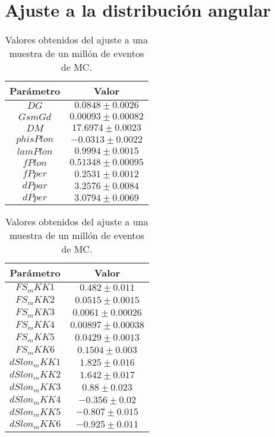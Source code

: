\section{Ajuste a la distribución angular}

\begin{table}[H]
\centering
\begin{multicols}{2}
\begin{tabular}{cc}
\toprule
Parámetro & Valor \\ \midrule
$ DG          $&$ 0.0848 \pm 0.0026 $ \\
$ GsmGd       $&$0.00093 \pm 0.00082$ \\
$ DM          $&$ 17.6974 \pm 0.0023$ \\
$ phisPlon    $&$ -0.0313 \pm 0.0022$ \\
$ lamPlon     $&$ 0.9994 \pm 0.0015 $ \\
$ fPlon       $&$0.51348 \pm 0.00095$ \\
$ fPper       $&$ 0.2531 \pm 0.0012 $ \\
$ dPpar       $&$ 3.2576 \pm 0.0084 $ \\
$ dPper       $&$ 3.0794 \pm 0.0069 $ \\
\bottomrule
\end{tabular}
\begin{tabular}{cc}
\toprule
Parámetro & Valor \\ \midrule
$ FS_mKK1     $&$  0.482 \pm 0.011  $ \\
$ FS_mKK2     $&$ 0.0515 \pm 0.0015 $ \\
$ FS_mKK3     $&$ 0.0061 \pm 0.00026$ \\
$ FS_mKK4     $&$0.00897 \pm 0.00038$ \\
$ FS_mKK5     $&$ 0.0429 \pm 0.0013 $ \\
$ FS_mKK6     $&$  0.1504 \pm 0.003 $ \\
$ dSlon_mKK1  $&$  1.825 \pm 0.016  $ \\
$ dSlon_mKK2  $&$  1.642 \pm 0.017  $ \\
$ dSlon_mKK3  $&$   0.88 \pm 0.023  $ \\
$ dSlon_mKK4  $&$  -0.356 \pm 0.02  $ \\
$ dSlon_mKK5  $&$  -0.807 \pm 0.015 $ \\
$ dSlon_mKK6  $&$  -0.925 \pm 0.011 $ \\
\bottomrule
\end{tabular}
\end{multicols}
  \caption{Valores obtenidos del ajuste a una muestra de un millón de eventos  de MC.}
\end{table}

